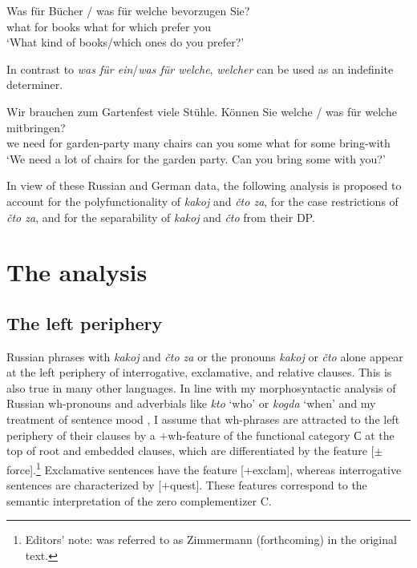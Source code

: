\documentclass[output=paper,colorlinks,citecolor=brown]{langscibook}
\begin{document}
\ea \label{ex:zi08:23}
    \gll Was für Bücher / was für welche bevorzugen Sie?\\
    what for books {} what for which prefer you\\
    \glt `What kind of books/which ones do you prefer?'
\z

\noindent In contrast to \textit{was für ein}/\textit{was für welche}, \textit{welcher} can be used as an indefinite determiner.

\ea \label{ex:zi08:24}
    \gll Wir brauchen zum Gartenfest viele Stühle. Können Sie welche /\hspace{.7cm} \minsp{*} was für welche mitbringen?\\
    we need for garden-party many chairs can you some {} %
    {} what for some bring-with\\
    \glt `We need a lot of chairs for the garden party. Can you bring some with you?'
\z

\noindent In view of these Russian and German data, the following analysis is proposed to account for the polyfunctionality of \textit{kakoj} and \textit{čto za}, for the case restrictions of \textit{čto za}, and for the separability of \textit{kakoj} and \textit{čto} from their DP.

\section{The analysis} \label{sec:zi08:3}

\subsection{The left periphery} \label{subsec3.1}

Russian phrases with \textit{kakoj} and \textit{čto za} or the pronouns \textit{kakoj} or \textit{čto} alone appear at the left periphery of interrogative, exclamative, and relative clauses. This is also true in many other languages. In line with my morphosyntactic analysis of Russian wh-pronouns and adverbials like \textit{kto} `who' or \textit{kogda} `when' \citep{zi08:Zimmermann2000} and my treatment of sentence mood \citep{Zimmermann2009}, I assume that wh-phrases are attracted to the left periphery of their clauses by a $+$wh-feature of the functional category С at the top of root and embedded clauses, which are differentiated by the feature [$\pm$force].\footnote{Editors' note: \citet{Zimmermann2009} was referred to as Zimmermann (forthcoming) in the original text.} Exclamative sentences have the feature [$+$exclam], whereas interrogative sentences are characterized by [$+$quest]. These features correspond to the semantic interpretation of the zero complementizer C.
\end{document}
